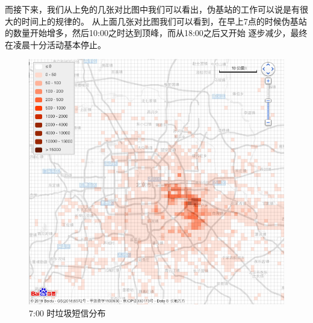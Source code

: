 \documentclass[12pt,a4paper]{article}
\begin{document}
\begin{itemize}
	而接下来，我们从上免的几张对比图中我们可以看出，伪基站的工作可以说是有很大的时间上的规律的。
	从上面几张对比图我们可以看到，在早上7点的时候伪基站的数量开始增多，然后10:00之时达到顶峰，而从18:00之后又开始
	逐步减少，最终在凌晨十分活动基本停止。

	\begin{flushleft}
		\begin{figure}[H]
			\centering
				\includegraphics[width=\linewidth]{7.png}
				\caption{7:00 时垃圾短信分布}
		\end{figure}
	\end{flushleft}


\end{itemize}
\end{document}
